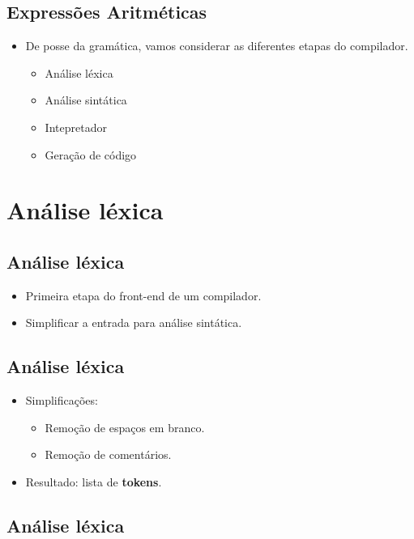 \documentclass[11pt]{article}
\begin{document}
\subsection*{Expressões Aritméticas}
\label{sec:org11dbd47}

\begin{itemize}
\item De posse da gramática, vamos considerar as diferentes etapas do compilador. 
\begin{itemize}
\item Análise léxica
\item Análise sintática
\item Intepretador
\item Geração de código
\end{itemize}
\end{itemize}
\section*{Análise léxica}
\label{sec:org35a292a}

\subsection*{Análise léxica}
\label{sec:org57212e1}

\begin{itemize}
\item Primeira etapa do front-end de um compilador.
\item Simplificar a entrada para análise sintática.
\end{itemize}
\subsection*{Análise léxica}
\label{sec:orgbdbd78f}

\begin{itemize}
\item Simplificações:
\begin{itemize}
\item Remoção de espaços em branco.
\item Remoção de comentários.
\end{itemize}

\item Resultado: lista de \textbf{\textbf{tokens}}.
\end{itemize}
\subsection*{Análise léxica}
\label{sec:org1e36cbd}
\end{document}
